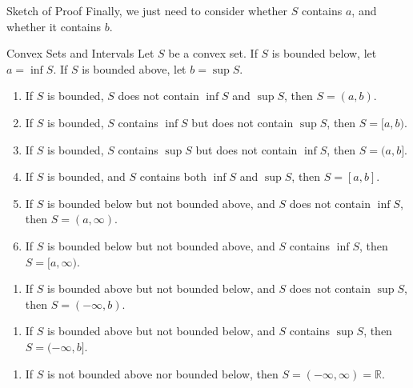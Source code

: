 \begin{example}
\begin{myproof}{Sketch of Proof}
 Finally, we just need to consider   whether $S$ contains $a$, and whether it contains $b$. 
\end{myproof}

\begin{highlight}{Convex Sets and Intervals}
Let $S$ be a convex set. If $S$ is bounded below, let $a=\inf S$.  If $S$ is bounded above, let $b=\sup S$.  
\begin{enumerate}[1.]
\item If $S$ is bounded, $S$ does not contain $\inf S$ and $\sup S$, then $S=(a,b)$.
\item If $S$ is bounded, $S$  contains $\inf S$ but does not contain $\sup S$, then $S=[a,b)$.
\item If $S$ is bounded, $S$  contains $\sup S$ but does not contain $\inf S$, then $S=(a,b]$.
\item If $S$ is bounded, and $S$  contains both $\inf S$ and $\sup S$, then $S=[a,b]$.
\item If $S$ is bounded below but not bounded above, and $S$ does not contain $\inf S$, then $S=(a,\infty)$.
\item If $S$ is bounded below but not bounded above, and $S$   contains $\inf S$, then $S=[a,\infty)$.
\end{enumerate}\begin{enumerate}[7.]
\item If $S$ is bounded above but not bounded below, and $S$ does not contain $\sup S$, then $S=(-\infty, b)$.
\end{enumerate}\end{highlight}\begin{highlight}{}\begin{enumerate}[8.]
\item If $S$ is bounded above but not bounded below, and $S$   contains $\sup S$, then $S=(-\infty, b]$.
\end{enumerate}\begin{enumerate}[9.]
\item If $S$ is not bounded above nor bounded below, then $S=(-\infty, \infty)=\mathbb{R}$.
\end{enumerate}
\end{highlight}


\end{example}
